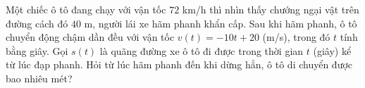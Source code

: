 \begin{ex}%
	Một chiếc ô tô đang chạy với vận tốc $72$ km/h thì nhìn thấy chướng ngại vật trên đường cách đó $40$ m, người lái xe hãm phanh khẩn cấp. Sau khi hãm phanh, ô tô chuyển động chậm dần đều với vận tốc $v(t)=-10t+20$ (m/s), trong đó $t$ tính bằng giây. Gọi $s(t)$ là quãng đường xe ô tô đi được trong thời gian $t$ (giây) kể từ lúc đạp phanh.
	Hỏi từ lúc hãm phanh đến khi dừng hẳn, ô tô di chuyển được bao nhiêu mét?
\end{ex}

